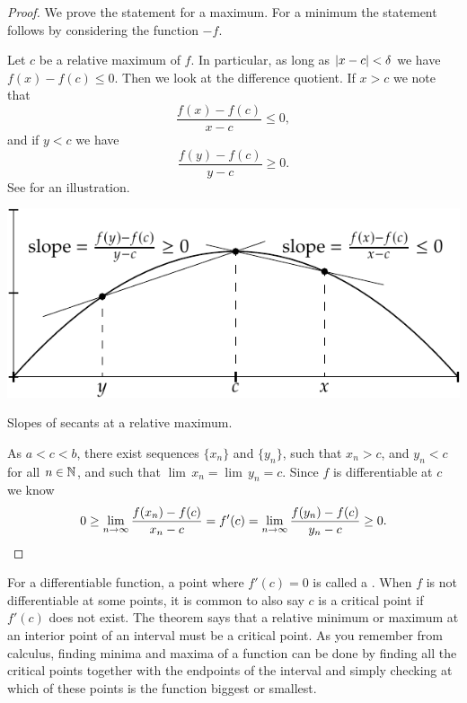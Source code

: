 \begin{proof}
We prove the statement for a maximum.  For a minimum the statement
follows by considering the function $-f$.

Let $c$ be a relative maximum of $f$.  In particular, as long
as $\left\lvert {x-c} \right\rvert < \delta$ we have $f(x)-f(c) \leq 0$.
Then we look at the difference
quotient.  If $x > c$ we note that
\begin{equation*}
\frac{f(x)-f(c)}{x-c} \leq 0 ,
\end{equation*}
and if $y < c$ we have
\begin{equation*}
\frac{f(y)-f(c)}{y-c} \geq 0 .
\end{equation*}
See  for an illustration.
\begin{myfigureht}
\includegraphics{figures/critpt}
\caption{Slopes of secants at a relative maximum.\label{fig:critpt}}
\end{myfigureht}

As $a < c < b$, there exist
sequences $\{ x_n\}$ and $\{ y_n \}$, such
that $x_n > c$, and
$y_n < c$ for all $n \in {\mathbb{N}}$, and such that
 $\lim\, x_n = \lim\, y_n = c$.
Since $f$
is differentiable at $c$ we know 
\begin{equation*}
0 \geq \lim_{n\to\infty} \frac{f(x_n)-f(c)}{x_n-c} 
=
f'(c)
=
\lim_{n\to\infty} \frac{f(y_n)-f(c)}{y_n-c} \geq 0.  \qedhere
\end{equation*}
\end{proof}

For a differentiable function, a point where 
$f'(c) = 0$ is called a \emph{}.  When $f$ is not
differentiable at some points,
it is common to also say $c$ is a critical point
if $f'(c)$ does not exist.
The theorem says that a relative minimum or maximum at an interior point
of an interval must be a critical point.
As you remember from calculus, finding minima and maxima of a function can
be done by finding all the critical points together with the endpoints of
the interval and simply checking at which of these points
is the function biggest or smallest.

